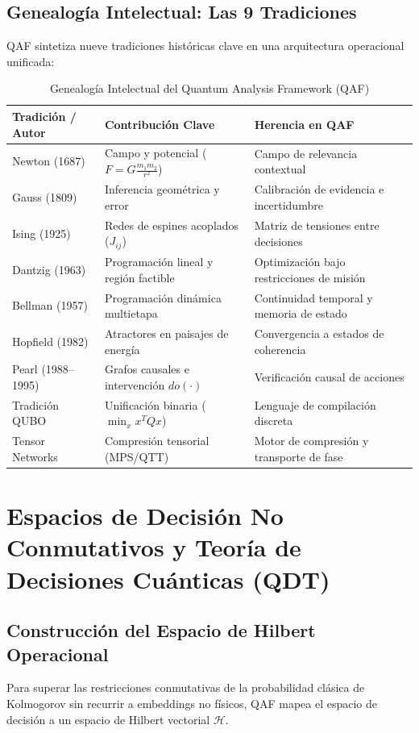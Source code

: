 \documentclass[11pt,a4paper,oneside]{report}
\begin{document}
\section{Genealogía Intelectual: Las 9 Tradiciones}
QAF sintetiza nueve tradiciones históricas clave en una arquitectura operacional unificada:
\begin{table}[h]
\centering
\caption{Genealogía Intelectual del Quantum Analysis Framework (QAF)}
\vspace{0.3cm}
\begin{tabular}{lll}
\toprule
\textbf{Tradición / Autor} & \textbf{Contribución Clave} & \textbf{Herencia en QAF} \\
\midrule
Newton (1687) & Campo y potencial ($F = G \frac{m_1 m_2}{r^2}$) & Campo de relevancia contextual \\
Gauss (1809) & Inferencia geométrica y error & Calibración de evidencia e incertidumbre \\
Ising (1925) & Redes de espines acoplados ($J_{ij}$) & Matriz de tensiones entre decisiones \\
Dantzig (1963) & Programación lineal y región factible & Optimización bajo restricciones de misión \\
Bellman (1957) & Programación dinámica multietapa & Continuidad temporal y memoria de estado \\
Hopfield (1982) & Atractores en paisajes de energía & Convergencia a estados de coherencia \\
Pearl (1988--1995) & Grafos causales e intervención $do(\cdot)$ & Verificación causal de acciones \\
Tradición QUBO & Unificación binaria ($\min_x x^T Q x$) & Lenguaje de compilación discreta \\
Tensor Networks & Compresión tensorial (MPS/QTT) & Motor de compresión y transporte de fase \\
\bottomrule
\end{tabular}
\end{table}


\chapter{Espacios de Decisión No Conmutativos y Teoría de Decisiones Cuánticas (QDT)}
\label{cap:qdt_no_conmutativo}

\section{Construcción del Espacio de Hilbert Operacional}
Para superar las restricciones conmutativas de la probabilidad clásica de Kolmogorov sin recurrir a embeddings no físicos, QAF mapea el espacio de decisión a un espacio de Hilbert vectorial $\mathcal{H}$.
\end{document}
